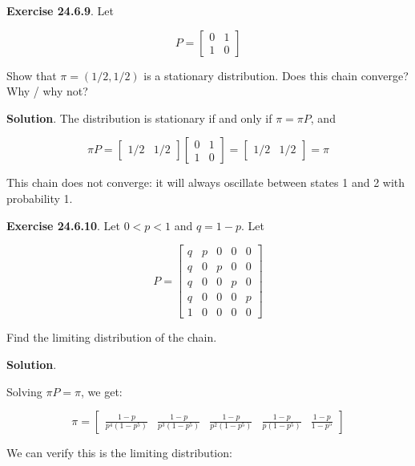 \textbf{Exercise 24.6.9}. Let

\[ P = \begin{bmatrix}
0 & 1 \\
1 & 0
\end{bmatrix}\]

Show that \(\pi = (1/2, 1/2)\) is a stationary distribution. Does this
chain converge? Why / why not?

\textbf{Solution}. The distribution is stationary if and only if
\(\pi = \pi P\), and

\[ \pi P = \begin{bmatrix} 1/2 & 1/2 \end{bmatrix}
\begin{bmatrix} 0 & 1 \\ 1 & 0 \end{bmatrix}
= \begin{bmatrix} 1/2 & 1/2 \end{bmatrix} = \pi
\]

This chain does not converge: it will always oscillate between states 1
and 2 with probability 1.

\textbf{Exercise 24.6.10}. Let \(0 < p < 1\) and \(q = 1 - p\). Let

\[ P = 
\begin{bmatrix}
q & p & 0 & 0 & 0 \\
q & 0 & p & 0 & 0 \\
q & 0 & 0 & p & 0 \\
q & 0 & 0 & 0 & p \\
1 & 0 & 0 & 0 & 0
\end{bmatrix}
\]

Find the limiting distribution of the chain.

\textbf{Solution}.

Solving \(\pi P = \pi\), we get:

\[ \pi = \begin{bmatrix} 
\frac{1 - p}{p^{4}(1 - p^{5})} &
\frac{1 - p}{p^{3}(1 - p^{5})} &
\frac{1 - p}{p^{2}(1 - p^{5})} &
\frac{1 - p}{p(1 - p^{5})} &
\frac{1 - p}{1 - p^{5}}
\end{bmatrix} \]

We can verify this is the limiting distribution:

